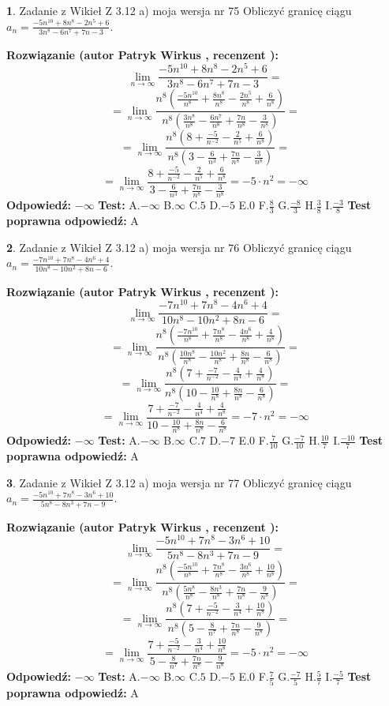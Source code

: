 \documentclass[12pt, a4paper]{article}
\theoremstyle{definition} %
\newtheorem{zad}{}
\newcommand{\zadStart}[1]{\begin{zad}#1\newline}
\newcommand{\zadStop}{\end{zad}}
\newcommand{\rozwStart}[2]{\noindent \textbf{Rozwiązanie (autor #1 , recenzent #2): }\newline}
\newcommand{\rozwStop}{\newline}
\newcommand{\odpStart}{\noindent \textbf{Odpowiedź:}\newline}
\newcommand{\odpStop}{\newline}
\newcommand{\testStart}{\noindent \textbf{Test:}\newline}
\newcommand{\testStop}{\newline}
\newcommand{\kluczStart}{\noindent \textbf{Test poprawna odpowiedź:}\newline}
\newcommand{\kluczStop}{\newline}
\begin{document}
\zadStart{Zadanie z Wikieł Z 3.12 a) moja wersja nr 75}
Obliczyć granicę ciągu $a_{n}=\frac{-5n^{10}+8n^{8}-2n^{5}+6}{3n^{8}-6n^{7}+7n-3}$.
\zadStop
\rozwStart{Patryk Wirkus}{}
$$\lim\limits_{n\to\infty}\frac{-5n^{10}+8n^{8}-2n^{5}+6}{3n^{8}-6n^{7}+7n-3}=$$
$$=\lim\limits_{n\to\infty}\frac{n^{8}\left(\frac{-5n^{10}}{n^{8}}+\frac{8n^{8}}{n^{8}}-\frac{2n^{5}}{n^{8}}+\frac{6}{n^{8}}\right)}{n^{8}\left(\frac{3n^{8}}{n^{8}}-\frac{6n^{7}}{n^{8}}+\frac{7n}{n^{8}}-\frac{3}{n^{8}}\right)}=$$
$$=\lim\limits_{n\to\infty}\frac{n^{8}\left(8+\frac{-5}{n^{-2}}-\frac{2}{n^{5}}+\frac{6}{n^{8}}\right)}
{n^{8}\left(3-\frac{6}{n^{3}}+\frac{7n}{n^{8}}-\frac{3}{n^{8}}\right)}=$$
$$=\lim\limits_{n\to\infty}\frac{8+\frac{-5}{n^{-2}}-\frac{2}{n^{5}}+\frac{6}{n^{8}}}{3-\frac{6}{n^{3}}+\frac{7n}{n^{8}}-\frac{3}{n^{8}}}=-5\cdot n^{2} = -\infty$$
\rozwStop
\odpStart
$-\infty$
\odpStop
\testStart
A.$-\infty$
B.$\infty$
C.$5$
D.$-5$
E.$0$
F.$\frac{8}{3}$
G.$\frac{-8}{3}$
H.$\frac{3}{8}$
I.$\frac{-3}{8}$
\testStop
\kluczStart
A
\kluczStop



\zadStart{Zadanie z Wikieł Z 3.12 a) moja wersja nr 76}
Obliczyć granicę ciągu $a_{n}=\frac{-7n^{10}+7n^{8}-4n^{6}+4}{10n^{8}-10n^{2}+8n-6}$.
\zadStop
\rozwStart{Patryk Wirkus}{}
$$\lim\limits_{n\to\infty}\frac{-7n^{10}+7n^{8}-4n^{6}+4}{10n^{8}-10n^{2}+8n-6}=$$
$$=\lim\limits_{n\to\infty}\frac{n^{8}\left(\frac{-7n^{10}}{n^{8}}+\frac{7n^{8}}{n^{8}}-\frac{4n^{6}}{n^{8}}+\frac{4}{n^{8}}\right)}{n^{8}\left(\frac{10n^{8}}{n^{8}}-\frac{10n^{2}}{n^{8}}+\frac{8n}{n^{8}}-\frac{6}{n^{8}}\right)}=$$
$$=\lim\limits_{n\to\infty}\frac{n^{8}\left(7+\frac{-7}{n^{-2}}-\frac{4}{n^{4}}+\frac{4}{n^{8}}\right)}
{n^{8}\left(10-\frac{10}{n^{8}}+\frac{8n}{n^{8}}-\frac{6}{n^{8}}\right)}=$$
$$=\lim\limits_{n\to\infty}\frac{7+\frac{-7}{n^{-2}}-\frac{4}{n^{4}}+\frac{4}{n^{8}}}{10-\frac{10}{n^{8}}+\frac{8n}{n^{8}}-\frac{6}{n^{8}}}=-7\cdot n^{2} = -\infty$$
\rozwStop
\odpStart
$-\infty$
\odpStop
\testStart
A.$-\infty$
B.$\infty$
C.$7$
D.$-7$
E.$0$
F.$\frac{7}{10}$
G.$\frac{-7}{10}$
H.$\frac{10}{7}$
I.$\frac{-10}{7}$
\testStop
\kluczStart
A
\kluczStop



\zadStart{Zadanie z Wikieł Z 3.12 a) moja wersja nr 77}
Obliczyć granicę ciągu $a_{n}=\frac{-5n^{10}+7n^{8}-3n^{6}+10}{5n^{8}-8n^{3}+7n-9}$.
\zadStop
\rozwStart{Patryk Wirkus}{}
$$\lim\limits_{n\to\infty}\frac{-5n^{10}+7n^{8}-3n^{6}+10}{5n^{8}-8n^{3}+7n-9}=$$
$$=\lim\limits_{n\to\infty}\frac{n^{8}\left(\frac{-5n^{10}}{n^{8}}+\frac{7n^{8}}{n^{8}}-\frac{3n^{6}}{n^{8}}+\frac{10}{n^{8}}\right)}{n^{8}\left(\frac{5n^{8}}{n^{8}}-\frac{8n^{3}}{n^{8}}+\frac{7n}{n^{8}}-\frac{9}{n^{8}}\right)}=$$
$$=\lim\limits_{n\to\infty}\frac{n^{8}\left(7+\frac{-5}{n^{-2}}-\frac{3}{n^{4}}+\frac{10}{n^{8}}\right)}
{n^{8}\left(5-\frac{8}{n^{7}}+\frac{7n}{n^{8}}-\frac{9}{n^{8}}\right)}=$$
$$=\lim\limits_{n\to\infty}\frac{7+\frac{-5}{n^{-2}}-\frac{3}{n^{4}}+\frac{10}{n^{8}}}{5-\frac{8}{n^{7}}+\frac{7n}{n^{8}}-\frac{9}{n^{8}}}=-5\cdot n^{2} = -\infty$$
\rozwStop
\odpStart
$-\infty$
\odpStop
\testStart
A.$-\infty$
B.$\infty$
C.$5$
D.$-5$
E.$0$
F.$\frac{7}{5}$
G.$\frac{-7}{5}$
H.$\frac{5}{7}$
I.$\frac{-5}{7}$
\testStop
\kluczStart
A
\kluczStop
\end{document}
